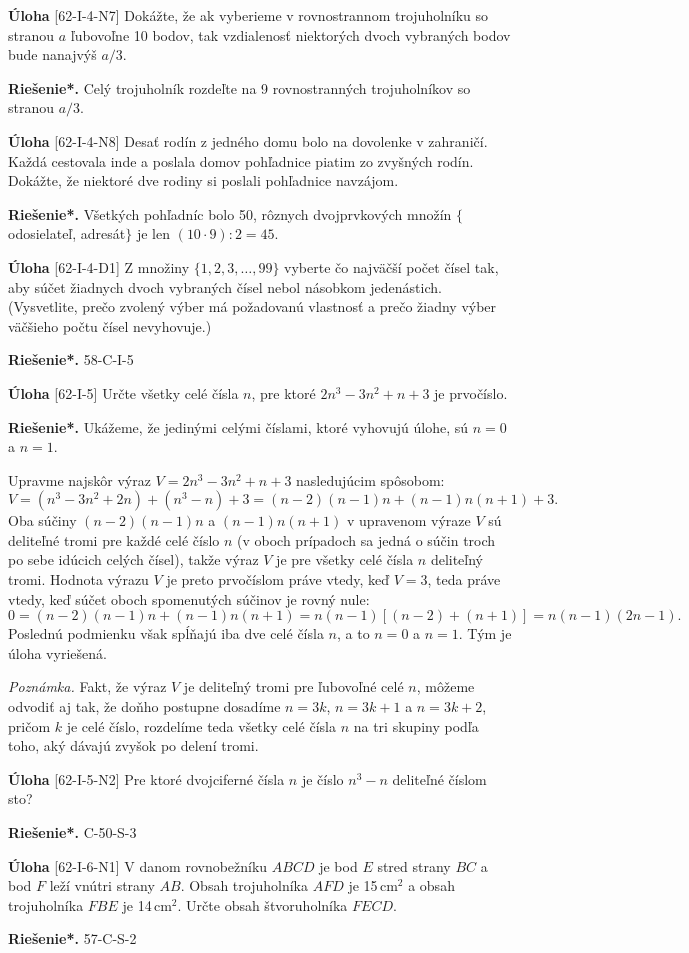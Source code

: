 \documentclass{article}
\newcommand{\rieh}{\textbf{Riešenie*.} }
\newcommand{\problem}[3]{
  \begin{tcolorbox}[breakable,notitle,boxrule=0pt,colback=light-gray,colframe=light-gray]
    \textbf{Úloha}
    [#1] #2
  \end{tcolorbox}
  \noindent#3
}
\begin{document}
\problem{62-I-4-N7}{
Dokážte, že ak vyberieme v rovnostrannom trojuholníku so stranou $a$ ľubovoľne 10 bodov, tak vzdialenosť niektorých dvoch vybraných bodov bude nanajvýš $a/3$.
}{
\rieh Celý trojuholník rozdeľte na 9 rovnostranných trojuholníkov so stranou $a/3$.
}


\problem{62-I-4-N8}{
Desať rodín z jedného domu bolo na dovolenke v zahraničí. Každá cestovala inde a poslala domov pohľadnice piatim zo zvyšných rodín. Dokážte, že niektoré dve rodiny si poslali pohľadnice navzájom.
}{
\rieh Všetkých pohľadníc bolo 50, rôznych dvojprvkových množín $\{$odosielateľ, adresát$\}$ je len $(10\cdot9) : 2 = 45$.
}


\problem{62-I-4-D1}{
Z množiny $\{1, 2, 3, \ldots , 99\}$ vyberte čo najväčší počet čísel tak, aby súčet žiadnych dvoch vybraných čísel nebol násobkom jedenástich. (Vysvetlite, prečo zvolený výber má požadovanú vlastnosť a prečo žiadny výber väčšieho počtu čísel nevyhovuje.)
}{
\rieh 58-C-I-5
}


\problem{62-I-5}{
Určte všetky celé čísla $n$, pre ktoré $2n^3 -3n^2 +n+3$ je prvočíslo. 
}{
\rieh Ukážeme, že jedinými celými číslami, ktoré vyhovujú úlohe, sú $n = 0$ a $n = 1$.

Upravme najskôr výraz $V = 2n^3 - 3n^2 + n + 3$ nasledujúcim spôsobom:
$$V = (n^3 - 3n^2+ 2n) + (n^3 - n) + 3 = (n - 2)(n - 1)n + (n - 1)n(n + 1) + 3.$$
Oba súčiny $(n-2)(n-1)n$ a $(n-1)n(n+1)$ v upravenom výraze $V$ sú deliteľné tromi pre každé celé číslo $n$ (v oboch prípadoch sa jedná o súčin troch po sebe idúcich celých čísel), takže výraz $V$ je pre všetky celé čísla $n$ deliteľný tromi. Hodnota výrazu $V$ je preto prvočíslom práve vtedy, keď $V = 3$, teda práve vtedy, keď súčet oboch spomenutých súčinov je rovný nule:
$$0 = (n - 2)(n - 1)n + (n - 1)n(n + 1) = n(n - 1)[(n - 2) + (n + 1)] = n(n - 1)(2n - 1).$$
Poslednú podmienku však spĺňajú iba dve celé čísla $n$, a to $n = 0$ a $n = 1$. Tým je úloha vyriešená.
 
\textit{Poznámka.} Fakt, že výraz $V$ je deliteľný tromi pre ľubovoľné celé $n$, môžeme odvodiť aj tak, že doňho postupne dosadíme $n = 3k$, $n = 3k + 1$ a $n = 3k + 2$, pričom $k$ je celé číslo, rozdelíme teda všetky celé čísla $n$ na tri skupiny podľa toho, aký dávajú zvyšok po delení tromi. 
}


\problem{62-I-5-N2}{
Pre ktoré dvojciferné čísla $n$ je číslo $n^3-n$ deliteľné číslom sto? 
}{
\rieh C-50-S-3
}


\problem{62-I-6-N1}{
V danom rovnobežníku $ABCD$ je bod $E$ stred strany $BC$ a bod $F$ leží vnútri strany $AB$. Obsah trojuholníka $AFD$ je 15\,cm$^2$ a obsah trojuholníka $FBE$ je 14\,cm$^2$. Určte obsah štvoruholníka $FECD$.
}{
\rieh 57-C-S-2
}
\end{document}

